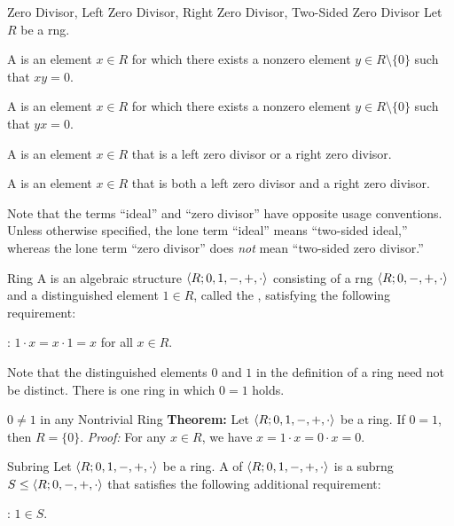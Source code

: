 \documentclass[12pt]{report}
\begin{document}
\begin{dfnbox}{Zero Divisor, Left Zero Divisor, Right Zero Divisor, Two-Sided Zero Divisor}
	Let $R$ be a rng.
	\begin{dfnitems}
		\item A  is an element $x \in R$ for which there exists a nonzero element $y \in R \setminus \{0\}$ such that $xy = 0$.
		\item A  is an element $x \in R$ for which there exists a nonzero element $y \in R \setminus \{0\}$ such that $yx = 0$.
		\item A  is an element $x \in R$ that is a left zero divisor or a right zero divisor.
		\item A  is an element $x \in R$ that is both a left zero divisor and a right zero divisor.
	\end{dfnitems}
\end{dfnbox}

Note that the terms ``ideal'' and ``zero divisor'' have opposite usage conventions. Unless otherwise specified, the lone term ``ideal'' means ``two-sided ideal,'' whereas the lone term ``zero divisor'' does \textit{not} mean ``two-sided zero divisor.''

\begin{dfnbox}{Ring}
	A  is an algebraic structure ${\langle {R; 0, 1, -, +, \cdot} \rangle}$ consisting of a rng ${\langle {R; 0, -, +, \cdot} \rangle}$ and a distinguished element $1 \in R$, called the , satisfying the following requirement:
	\begin{dfnitems}
		\item {}: $1 \cdot x = x \cdot 1 = x$ for all $x \in R$.
	\end{dfnitems}
\end{dfnbox}

Note that the distinguished elements $0$ and $1$ in the definition of a ring need not be distinct. There is one ring in which $0 = 1$ holds.

\begin{thmbox}{$0 \ne 1$ in any Nontrivial Ring}
	\textbf{Theorem:} Let ${\langle {R; 0, 1, -, +, \cdot} \rangle}$ be a ring. If $0 = 1$, then $R = \{0\}$.
\tcblower
	\textit{Proof:} For any $x \in R$, we have $x = 1 \cdot x = 0 \cdot x = 0$.
\end{thmbox}

\begin{dfnbox}{Subring}
	Let ${\langle {R; 0, 1, -, +, \cdot} \rangle}$ be a ring. A  of ${\langle {R; 0, 1, -, +, \cdot} \rangle}$ is a subrng $S \le {\langle {R; 0, -, +, \cdot} \rangle}$ that satisfies the following additional requirement:
	\begin{dfnitems}
		\item {}: $1 \in S$.
	\end{dfnitems}
\end{dfnbox}
\end{document}
